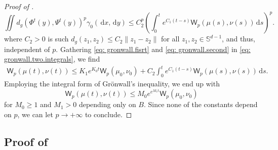\documentclass[a4paper,11pt]{article}
\theoremstyle{plain}
\newcommand{\diff}{\, \mathrm{d}}
\renewcommand{\S}{\mathbb{S}^{d-1}}
\newcommand{\bB}{\bm{\mathit{B}}}
\renewcommand{\leq}{\leqslant}
\renewcommand{\geq}{\geqslant}
\numberwithin{equation}{section}
\begin{document}
\begin{proof}[Proof of ]
\begin{equation}
    \iint d_g(\Phi^t(y),\Psi^t(y))^p\gamma_0(\diff x,\diff y)\leq C_2^p  \left(\int_0^t e^{C_1(t-s)}\mathsf{W}_p(\mu(s),\nu(s))\diff s\right)^p.
\end{equation}
where $C_2>0$ is such $d_g(z_1,z_2)\leq C_2\|z_1-z_2\|$ for all $z_1,z_2\in \S$, and thus, independent of $p$.
Gathering \eqref{eq: gronwall.fisrt} and \eqref{eq: gronwall.second} in \eqref{eq: gronwall.two.integrals}, we find
\begin{align*}
    \mathsf{W}_p(\mu(t),\nu(t))\leq K_1e^{K_0t}\mathsf{W}_p(\mu_0,\nu_0)+C_2\int_0^t e^{C_1 (t-s)}\mathsf{W}_p(\mu(s),\nu(s))\diff s.
\end{align*}
Employing the integral form of Grönwall's inequality, we end up with
\begin{equation*}
    \mathsf{W}_p(\mu(t),\nu(t))\leq M_0 e^{e^{M_1t}}\mathsf{W}_p(\mu_0,\nu_0)
\end{equation*}
for $M_0\geq 1$ and $M_1>0$ depending only on $\bB$.
Since none of the constants depend on $p$, we can let $p\to +\infty$ to conclude.
\end{proof}

\subsection{\texorpdfstring{Proof of }{Proof of Lemma}}
\label{app: proof.cluster.time}
\end{document}
